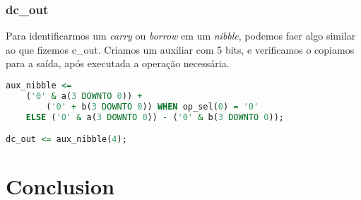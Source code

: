 \documentclass{article}
\begin{document}
\subsubsection{dc\_out}

Para identificarmos um \textit{carry} ou \textit{borrow} em um \textit{nibble}, podemos faer algo similar ao que fizemos c\_out. Criamos um auxiliar com 5 bits, e verificamos o copiamos para a saída, após executada a operação necessária.

\begin{lstlisting}[language=VHDL]
aux_nibble <=
    ('0' & a(3 DOWNTO 0)) +
        ('0' + b(3 DOWNTO 0)) WHEN op_sel(0) = '0' 
	ELSE ('0' & a(3 DOWNTO 0)) - ('0' & b(3 DOWNTO 0));

dc_out <= aux_nibble(4);
\end{lstlisting}

\section{Conclusion}
\lipsum[4]
\end{document}
